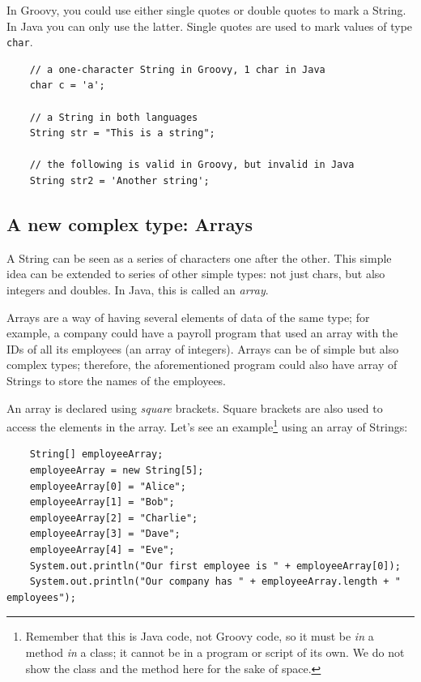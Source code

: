 In Groovy, you could use either single quotes or double quotes to mark
a String. In Java you can only use the latter. Single quotes are used
to mark values of type \verb+char+. 

\begin{verbatim}
    // a one-character String in Groovy, 1 char in Java
    char c = 'a';               

    // a String in both languages
    String str = "This is a string";

    // the following is valid in Groovy, but invalid in Java
    String str2 = 'Another string';  
\end{verbatim}

\subsection{A new complex type: Arrays}
\label{sec:arrays}

A String can be seen as a series of characters one after the
other. This simple idea can be extended to series of other simple
types: not just chars, but also integers and doubles. In Java, 
this is called an \emph{array}. 

Arrays are a way of having several elements of data of the same type;
for example, a company could have a payroll program that used an array with
the IDs of all its employees (an array of integers). 
Arrays can be of simple but also complex types; therefore, the
aforementioned program could also have array of Strings to store the
names of the employees. 

An array is declared using \emph{square} brackets. Square brackets are also
used to access the elements in the array. Let's see an 
example\footnote{Remember that this is Java code, not Groovy code, so
  it must be \emph{in} a method \emph{in} a class; it cannot be in a
  program or script of its own. We do not show the class and the
  method here for the sake of space.} using an
array of Strings: 

\begin{verbatim}
    String[] employeeArray;
    employeeArray = new String[5];
    employeeArray[0] = "Alice";
    employeeArray[1] = "Bob";
    employeeArray[2] = "Charlie";
    employeeArray[3] = "Dave";
    employeeArray[4] = "Eve";
    System.out.println("Our first employee is " + employeeArray[0]);
    System.out.println("Our company has " + employeeArray.length + " employees");
\end{verbatim}

